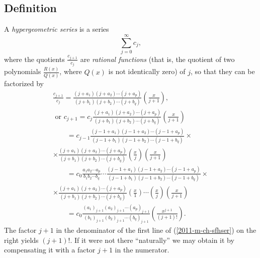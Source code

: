 \subsection{Definition}
A
{\em hypergeometric series}
is a series
\begin{equation}
\sum_{j=0}^\infty c_j ,
\label{2011-m-ch-sfhserd}
\end{equation}
where the quotients $\frac{c_{j+1}}{c_j}$ are {\em rational functions} (that is, the quotient of two polynomials
$\frac{R(x)}{Q(x)}$, where $Q(x)$ is not identically zero) of $j$, so that they can be factorized by
\begin{equation}
\begin{split}
\frac{c_{j+1}}{c_j}
=
\frac{(j+a_1)(j+a_2)\cdots (j+a_p)}{(j+b_1)(j+b_2)\cdots (j+b_q)}
\left(\frac{x}{j+1}\right),
\\
 \textrm{ or } c_{j+1}
=  c_j
\frac{(j+a_1)(j+a_2)\cdots (j+a_p)}{(j+b_1)(j+b_2)\cdots (j+b_q)}
\left(\frac{x}{j+1}\right)
\\
\qquad =
 c_{j-1}
\frac{(j-1+a_1)(j-1+a_2)\cdots (j-1+a_p)}{(j-1+b_1)(j-1+b_2)\cdots (j-1+b_q)}
\times
\\
\times
\frac{(j+a_1)(j+a_2)\cdots (j+a_p)}{(j+b_1)(j+b_2)\cdots (j+b_q)}
\left(\frac{x}{j}\right)
\left(\frac{x}{j+1}\right)
\\
\qquad =
 c_{0}
\frac{a_1 a_2\cdots a_p}{b_1 b_2\cdots b_q}
\cdots
\frac{(j-1+a_1)(j-1+a_2)\cdots (j-1+a_p)}{(j-1+b_1)(j-1+b_2)\cdots (j-1+b_q)}
\times
\\
\times
\frac{(j+a_1)(j+a_2)\cdots (j+a_p)}{(j+b_1)(j+b_2)\cdots (j+b_q)}
\left(\frac{x}{1}\right)
\cdots
\left(\frac{x}{j}\right)
\left(\frac{x}{j+1}\right)
\\
\qquad =
 c_{0}
\frac{(a_1)_{j+1}(a_2)_{j+1}\cdots (a_p)_{j+1}}{(b_1)_{j+1}(b_2)_{j+1}\cdots (b_q)_{j+1}}
\left(\frac{x^{j+1}}{(j+1)!}\right)
.
\end{split}
\label{2011-m-ch-sfhser}
\end{equation}
The factor $j+1$ in the denominator of the first  line of (\ref{2011-m-ch-sfhser})
on the right
yields $(j+1)!$.
If it were not there ``naturally''
we may obtain it by compensating it with a factor $j+1$ in the numerator.


